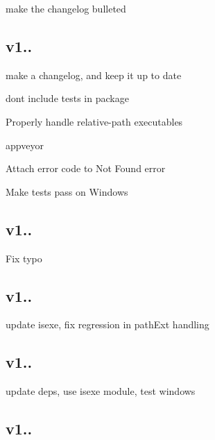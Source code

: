 \begin{DoxyItemize}
\item make the changelog bulleted
\end{DoxyItemize}

\subsection*{v1..}


\begin{DoxyItemize}
\item make a changelog, and keep it up to date
\item don\textquotesingle{}t include tests in package
\item Properly handle relative-\/path executables
\item appveyor
\item Attach error code to Not Found error
\item Make tests pass on Windows
\end{DoxyItemize}

\subsection*{v1..}


\begin{DoxyItemize}
\item Fix typo
\end{DoxyItemize}

\subsection*{v1..}


\begin{DoxyItemize}
\item update isexe, fix regression in path\+Ext handling
\end{DoxyItemize}

\subsection*{v1..}


\begin{DoxyItemize}
\item update deps, use isexe module, test windows
\end{DoxyItemize}

\subsection*{v1..}


